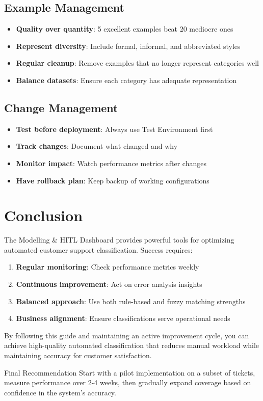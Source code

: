 \documentclass[11pt,a4paper]{article}
\begin{document}
\subsection{Example Management}
\begin{itemize}
    \item \textbf{Quality over quantity}: 5 excellent examples beat 20 mediocre ones
    \item \textbf{Represent diversity}: Include formal, informal, and abbreviated styles
    \item \textbf{Regular cleanup}: Remove examples that no longer represent categories well
    \item \textbf{Balance datasets}: Ensure each category has adequate representation
\end{itemize}

\subsection{Change Management}
\begin{itemize}
    \item \textbf{Test before deployment}: Always use Test Environment first
    \item \textbf{Track changes}: Document what changed and why
    \item \textbf{Monitor impact}: Watch performance metrics after changes
    \item \textbf{Have rollback plan}: Keep backup of working configurations
\end{itemize}

\section{Conclusion}

The Modelling \& HITL Dashboard provides powerful tools for optimizing automated customer support classification. Success requires:

\begin{enumerate}
    \item \textbf{Regular monitoring}: Check performance metrics weekly
    \item \textbf{Continuous improvement}: Act on error analysis insights
    \item \textbf{Balanced approach}: Use both rule-based and fuzzy matching strengths
    \item \textbf{Business alignment}: Ensure classifications serve operational needs
\end{enumerate}

By following this guide and maintaining an active improvement cycle, you can achieve high-quality automated classification that reduces manual workload while maintaining accuracy for customer satisfaction.

\begin{tipbox}{Final Recommendation}
Start with a pilot implementation on a subset of tickets, measure performance over 2-4 weeks, then gradually expand coverage based on confidence in the system's accuracy.
\end{tipbox}
\end{document}
